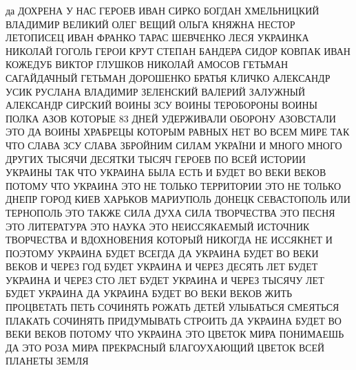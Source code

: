  
 
 
 
 

да ДОХРЕНА У НАС ГЕРОЕВ ИВАН СИРКО БОГДАН ХМЕЛЬНИЦКИЙ ВЛАДИМИР ВЕЛИКИЙ ОЛЕГ
ВЕЩИЙ ОЛЬГА КНЯЖНА НЕСТОР ЛЕТОПИСЕЦ ИВАН ФРАНКО ТАРАС ШЕВЧЕНКО ЛЕСЯ УКРАИНКА
НИКОЛАЙ ГОГОЛЬ ГЕРОИ КРУТ СТЕПАН БАНДЕРА СИДОР КОВПАК ИВАН КОЖЕДУБ ВИКТОР
ГЛУШКОВ НИКОЛАЙ АМОСОВ ГЕТЬМАН САГАЙДАЧНЫЙ ГЕТЬМАН ДОРОШЕНКО БРАТЬЯ КЛИЧКО
АЛЕКСАНДР УСИК РУСЛАНА ВЛАДИМИР ЗЕЛЕНСКИЙ ВАЛЕРИЙ ЗАЛУЖНЫЙ АЛЕКСАНДР СИРСКИЙ ВОИНЫ ЗСУ
ВОИНЫ ТЕРОБОРОНЫ ВОИНЫ ПОЛКА АЗОВ КОТОРЫЕ 83 ДНЕЙ УДЕРЖИВАЛИ ОБОРОНУ АЗОВСТАЛИ ЭТО ДА ВОИНЫ 
ХРАБРЕЦЫ КОТОРЫМ РАВНЫХ НЕТ ВО ВСЕМ МИРЕ ТАК ЧТО СЛАВА ЗСУ СЛАВА ЗБРОЙНИМ СИЛАМ УКРАЇНИ 
И МНОГО МНОГО ДРУГИХ ТЫСЯЧИ ДЕСЯТКИ ТЫСЯЧ ГЕРОЕВ ПО ВСЕЙ
ИСТОРИИ УКРАИНЫ ТАК ЧТО  УКРАИНА БЫЛА ЕСТЬ И БУДЕТ ВО ВЕКИ ВЕКОВ ПОТОМУ ЧТО
УКРАИНА ЭТО НЕ ТОЛЬКО ТЕРРИТОРИИ ЭТО НЕ ТОЛЬКО ДНЕПР ГОРОД КИЕВ ХАРЬКОВ
МАРИУПОЛЬ ДОНЕЦК СЕВАСТОПОЛЬ ИЛИ ТЕРНОПОЛЬ ЭТО ТАКЖЕ СИЛА ДУХА СИЛА ТВОРЧЕСТВА
ЭТО ПЕСНЯ ЭТО ЛИТЕРАТУРА ЭТО НАУКА ЭТО НЕИССЯКАЕМЫЙ ИСТОЧНИК ТВОРЧЕСТВА И
ВДОХНОВЕНИЯ КОТОРЫЙ НИКОГДА НЕ ИССЯКНЕТ И ПОЭТОМУ УКРАИНА БУДЕТ ВСЕГДА ДА
УКРАИНА БУДЕТ ВО ВЕКИ ВЕКОВ И ЧЕРЕЗ ГОД БУДЕТ УКРАИНА И ЧЕРЕЗ ДЕСЯТЬ ЛЕТ БУДЕТ
УКРАИНА И ЧЕРЕЗ СТО ЛЕТ БУДЕТ УКРАИНА И ЧЕРЕЗ ТЫСЯЧУ ЛЕТ БУДЕТ УКРАИНА ДА
УКРАИНА БУДЕТ ВО ВЕКИ ВЕКОВ ЖИТЬ ПРОЦВЕТАТЬ ПЕТЬ СОЧИНЯТЬ РОЖАТЬ ДЕТЕЙ
УЛЫБАТЬСЯ СМЕЯТЬСЯ ПЛАКАТЬ СОЧИНЯТЬ ПРИДУМЫВАТЬ СТРОИТЬ ДА УКРАИНА БУДЕТ ВО
ВЕКИ ВЕКОВ ПОТОМУ ЧТО УКРАИНА ЭТО ЦВЕТОК МИРА ПОНИМАЕШЬ ДА ЭТО РОЗА МИРА
ПРЕКРАСНЫЙ БЛАГОУХАЮЩИЙ ЦВЕТОК ВСЕЙ ПЛАНЕТЫ ЗЕМЛЯ
